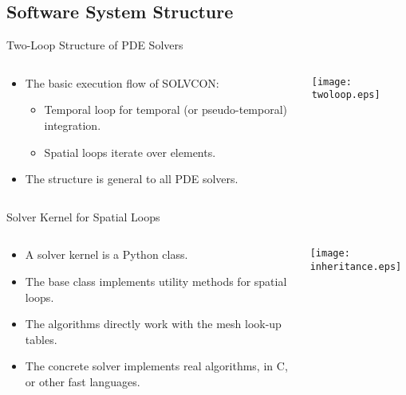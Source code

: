 \documentclass[dvips,xcolor=pst,14pt]{beamer}
\begin{document}
\subsection{
Software System Structure
}

\begin{frame}{
%
Two-Loop Structure of PDE Solvers
%
}
\begin{columns}[c]
\begin{column}{.5\textwidth}
\begin{itemize}
  \item The basic execution flow of SOLVCON:
  \begin{itemize}
    \item Temporal loop for temporal (or pseudo-temporal) integration.
    \item Spatial loops iterate over elements.
  \end{itemize}
  \item The structure is general to all PDE solvers.
\end{itemize}
\end{column}
\begin{column}{.5\textwidth}
  \texttt{[image: twoloop.eps]}
\end{column}
\end{columns}
\end{frame}

\begin{frame}{
%
Solver Kernel for Spatial Loops
%
}
\begin{columns}[c]
\begin{column}{.75\textwidth}
\begin{itemize}
  \item A solver kernel is a Python class.
  \item The base class implements utility methods for \alert{spatial loops}.
  \item The algorithms directly work with the mesh look-up tables.
  \item The concrete solver implements real algorithms, in \alert{C}, or other
  fast languages.
\end{itemize}
\end{column}
\begin{column}{.25\textwidth} \centering
  \texttt{[image: inheritance.eps]}
\end{column}
\end{columns}
\end{frame}
\end{document}
